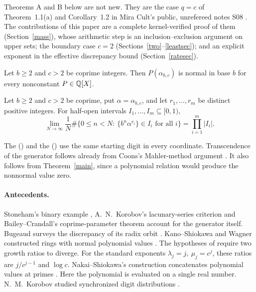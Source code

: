 \documentclass[11pt]{article}
\begin{document}
Theorems A and B below are not new. They are the case \(q=c\) of
Theorem~1.1(a) and Corollary~1.2 in Mira Cult's public, unrefereed notes
S08 \cite{mira2}. The contributions of this paper are a complete
kernel-verified proof of them (Section~\ref{mass}), whose arithmetic step
is an inclusion--exclusion argument on upper sets; the boundary case
\(c=2\) (Sections~\ref{two}--\ref{leastsec}); and an explicit exponent
in the effective discrepancy bound (Section~\ref{ratesec}).
\begin{maintheorem}[{Mira Cult \cite[S08, Thm.~1.1(a)]{mira2}, case \(q=c\)}]\label{main}
Let \(b\ge2\) and \(c>2\) be coprime integers. Then \(P(\alpha_{b,c})\)
is normal in base \(b\) for every nonconstant \(P\in\mathbb Q[X]\).
\end{maintheorem}
\begin{maintheorem}\label{joint}
Let \(b\ge2\) and \(c>2\) be coprime, put \(\alpha=\alpha_{b,c}\), and let
\(r_1,\ldots,r_m\) be distinct positive integers. For half-open intervals
\(I_1,\ldots,I_m\subseteq[0,1)\),
\[
 \lim_{N\to\infty}\frac1N\#\{0\le n<N:\ \{b^n\alpha^{r_i}\}\in I_i
             \text{ for all }i\}=\prod_{i=1}^m|I_i|.
\]
\end{maintheorem}
The 
() and the
() use the same
starting digit in every coordinate. Transcendence of the generator follows
already from Coons's Mahler-method argument \cite[Cor.~A.3 of the 2013 preprint]{coons}.
It also follows from Theorem~\ref{main}, since a polynomial relation would
produce the nonnormal value zero.

\paragraph{Antecedents.}
Stoneham's binary example \cite{stoneham}, A.~N.~Korobov's lacunary-series
criterion \cite{korobov,kano} and Bailey--Crandall's coprime-parameter
theorem \cite[Cor.~4.9]{bc} account for the generator itself.
Bugeaud surveys the discrepancy of its radix orbit \cite[\S5.1]{bugeaud}.
Kano--Shiokawa and Wagner constructed rings with normal polynomial values
\cite{ks,wagner}. The hypotheses of \cite[Thms.~4--5, institutional preprint (15)--(16)]{ks} require two
growth ratios to diverge. For the standard exponents
\(\lambda_j=j,\ \mu_j=c^j\), these ratios are \(j/c^{j-1}\) and \(\log c\).
Nakai--Shiokawa's construction concatenates polynomial values at primes
\cite{ns}. Here the polynomial is evaluated on a single real number.
N.~M.~Korobov studied synchronized digit distributions \cite{jointkorobov}.
\end{document}
